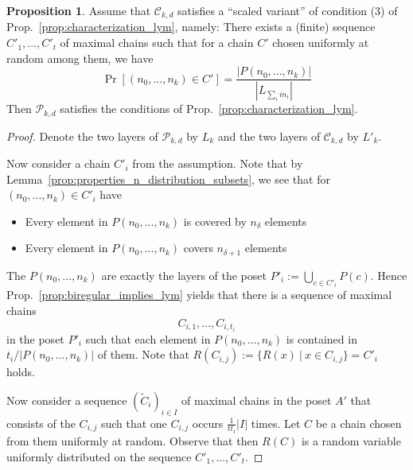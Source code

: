 \documentclass{scrartcl}
\theoremstyle{definition}
\newtheorem{proposition}[definition]{Proposition}
\begin{document}
\begin{proposition}
    Assume that $\mathcal{C}_{k, d}$ satisfies a ``scaled variant'' of condition (3) of Prop.~\ref{prop:characterization_lym}, namely:
    There exists a (finite) sequence $C'_1, ..., C'_t$ of maximal chains such that for a chain $C'$ chosen uniformly at random among them, we have
    \begin{equation*}
        \Pr[ (n_0, ..., n_k) \in C' ] = \frac {|P(n_0, ..., n_k)|} {|L_{\sum_i i n_i}|}
    \end{equation*}
    Then $\mathcal{P}_{k, d}$ satisfies the conditions of Prop.~\ref{prop:characterization_lym}.
\end{proposition}
\begin{proof}
    Denote the two layers of $\mathcal{P}_{k, d}$ by $L_k$ and the two layers of $\mathcal{C}_{k, d}$ by $L'_k$.

    Now consider a chain $C'_i$ from the assumption.
    Note that by Lemma~\ref{prop:properties_n_distribution_subsets}, we see that for $(n_0, ..., n_k) \in C'_i$ have
    \begin{itemize}
        \item Every element in $P(n_0, ..., n_k)$ is covered by $n_\delta$ elements
        \item Every element in $P(n_0, ..., n_k)$ covers $n_{\delta + 1}$ elements
    \end{itemize}
    The $P(n_0, ..., n_k)$ are exactly the layers of the poset $P'_i := \bigcup_{c \in C'_i} P(c)$.
    Hence Prop.~\ref{prop:biregular_implies_lym} yields that there is a sequence of maximal chains
    \begin{equation*}
        C_{i, 1}, ..., C_{i, t_i}
    \end{equation*}
    in the poset $P'_i$ such that each element in $P(n_0, ..., n_k)$ is contained in $t_i/|P(n_0, ..., n_k)|$ of them.
    Note that $R(C_{i, j}) := \{ R(x) \ | \ x \in C_{i, j} \} = C'_i$ holds.

    Now consider a sequence $(\tilde{C}_i)_{i \in I}$ of maximal chains in the poset $A'$ that consists of the $C_{i, j}$ such that one $C_{i, j}$ occurs $\frac 1 {t t_i} |I|$ times.
    Let $C$ be a chain chosen from them uniformly at random.
    Observe that then $R(C)$ is a random variable uniformly distributed on the sequence $C'_1, ..., C'_t$.


\end{proof}
\end{document}
